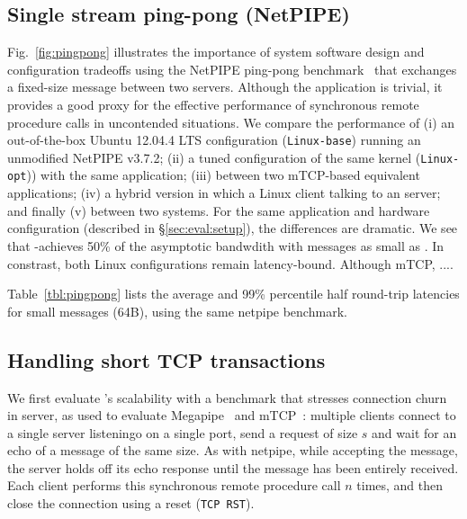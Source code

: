 
\subsection{Single stream ping-pong (NetPIPE)}
\label{sec:eval:netpipe}




Fig.~\ref{fig:pingpong} illustrates the importance of system software
design and configuration tradeoffs using the NetPIPE ping-pong
benchmark~\cite{snell1996netpipe} that exchanges a fixed-size message
between two servers.  Although the application is trivial, it provides
a good proxy for the effective performance of synchronous remote
procedure calls in uncontended situations.  We compare the performance
of (i) an out-of-the-box Ubuntu 12.04.4 LTS configuration
(\texttt{Linux-base}) running an unmodified NetPIPE v3.7.2; (ii) a
tuned configuration of the same kernel (\texttt{Linux-opt})) with the
same application; (iii) between two mTCP-based equivalent
applications; (iv) a hybrid version in which a Linux client talking to
an \ix server; and finally (v) between two \ix systems.  For the same
application and hardware configuration (described in
\S\ref{sec:eval:setup}), the differences are dramatic.  We see that
\ix-\ix achieves 50\% of the asymptotic bandwdith with messages as small
as .  In constrast, both Linux configurations remain
latency-bound.  Although mTCP, ....


Table~\ref{tbl:pingpong} lists the average and 99\% percentile half
round-trip latencies for small messages (64B), using the same netpipe
benchmark.  

\subsection{Handling short TCP transactions}
\label{sec:eval:short}



We first evaluate \ix's scalability with a benchmark that stresses
connection churn in server, as used to evaluate
Megapipe~\cite{han2012megapipe} and mTCP~\cite{jeong2014mtcp}:
multiple clients connect to a single server listeningo on a single
port, send a request of size $s$ and wait for an echo of a message of
the same size.  As with netpipe, while accepting the message, the server holds off its
echo response until the message has been entirely received.
Each client performs this synchronous remote procedure
call $n$ times, and then close the connection using a reset
(\texttt{TCP RST}).

